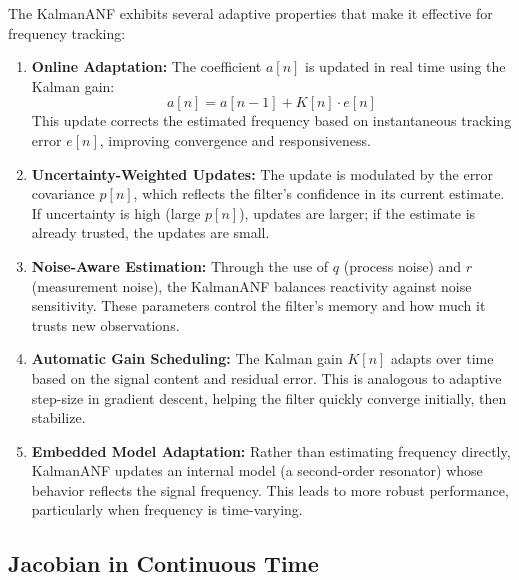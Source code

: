 \documentclass{article}
\begin{document}
The KalmanANF exhibits several adaptive properties that make it effective for frequency tracking:

\begin{enumerate}
  \item \textbf{Online Adaptation:} The coefficient \( a[n] \) is updated in real time using the Kalman gain:
  \[
  a[n] = a[n-1] + K[n] \cdot e[n]
  \]
  This update corrects the estimated frequency based on instantaneous tracking error \( e[n] \), improving convergence and responsiveness.

  \item \textbf{Uncertainty-Weighted Updates:} The update is modulated by the error covariance \( p[n] \), which reflects the filter's confidence in its current estimate. If uncertainty is high (large \( p[n] \)), updates are larger; if the estimate is already trusted, the updates are small.

  \item \textbf{Noise-Aware Estimation:} Through the use of \( q \) (process noise) and \( r \) (measurement noise), the KalmanANF balances reactivity against noise sensitivity. These parameters control the filter’s memory and how much it trusts new observations.

  \item \textbf{Automatic Gain Scheduling:} The Kalman gain \( K[n] \) adapts over time based on the signal content and residual error. This is analogous to adaptive step-size in gradient descent, helping the filter quickly converge initially, then stabilize.

  \item \textbf{Embedded Model Adaptation:} Rather than estimating frequency directly, KalmanANF updates an internal model (a second-order resonator) whose behavior reflects the signal frequency. This leads to more robust performance, particularly when frequency is time-varying.
\end{enumerate}

\subsection{Jacobian in Continuous Time}
\end{document}
